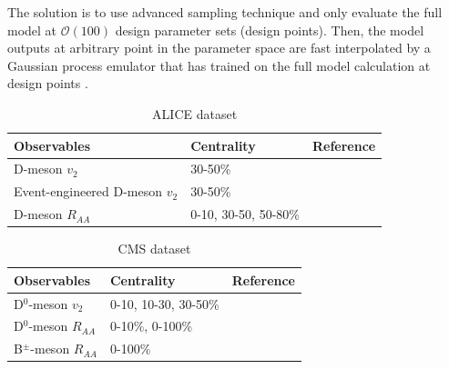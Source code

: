 \documentclass[aps, prc, reprint, amsmath, groupedaddress, nofootinbib]{revtex4-1}
\begin{document}
The solution is to use advanced sampling technique and only evaluate the full model at $\mathcal{O}(100)$ design parameter sets (design points).
Then, the model outputs at arbitrary point in the parameter space are fast interpolated by a Gaussian process emulator that has trained on the full model calculation at design points \cite{Rasmussen:2006gp}.
\begin{center}
\begin{table}[h]
\caption{ALICE dataset}\label{table:ALICE-obs} 
\begin{tabularx}{\columnwidth}{XXX}
\hline 
 Observables & Centrality & Reference\\ 
\hline 
D-meson $v_2$ & 30-50\% & \cite{Acharya:2017qps}\\ 
\hline 
Event-engineered D-meson $v_2$ & 30-50\% & \cite{Grosa:2017zcz}\\ 
\hline 
D-meson $R_{AA}$ & 0-10, 30-50, 50-80\% & \cite{Grosa:2017zcz}\\
\hline 
\end{tabularx}
\end{table}
\begin{table}[h]
\caption{CMS dataset}\label{table:CMS-obs} 
\begin{tabularx}{\columnwidth}{XXX}
\hline 
Observables & Centrality & Reference\\ 
\hline 
D${}^0$-meson $v_2$ & 0-10, 10-30, 30-50\% & \cite{Sirunyan:2017plt}\\ 
\hline 
D${}^0$-meson $R_{AA}$ & 0-10\%, 0-100\% & \cite{Sirunyan:2017xss}\\ 
\hline 
B${}^{\pm}$-meson $R_{AA}$ & 0-100\% & \cite{Sirunyan:2017oug}\\ 
\hline 
\end{tabularx}
\end{table}
\end{center}
\end{document}
